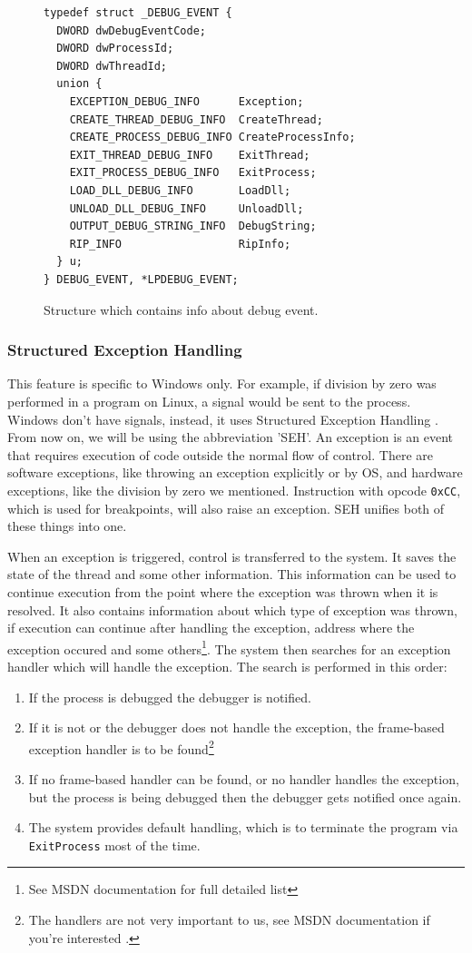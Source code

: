 \begin{figure}
\begin{verbatim}
typedef struct _DEBUG_EVENT {
  DWORD dwDebugEventCode;
  DWORD dwProcessId;
  DWORD dwThreadId;
  union {
    EXCEPTION_DEBUG_INFO      Exception;
    CREATE_THREAD_DEBUG_INFO  CreateThread;
    CREATE_PROCESS_DEBUG_INFO CreateProcessInfo;
    EXIT_THREAD_DEBUG_INFO    ExitThread;
    EXIT_PROCESS_DEBUG_INFO   ExitProcess;
    LOAD_DLL_DEBUG_INFO       LoadDll;
    UNLOAD_DLL_DEBUG_INFO     UnloadDll;
    OUTPUT_DEBUG_STRING_INFO  DebugString;
    RIP_INFO                  RipInfo;
  } u;
} DEBUG_EVENT, *LPDEBUG_EVENT;
\end{verbatim}
\caption{Structure which contains info about debug event.}
\label{fig:DebugEvent}
\end{figure}

\subsubsection*{Structured Exception Handling}
This feature is specific to Windows only. For example, if division by zero was
performed in a program on Linux, a signal would be sent to the process. Windows
don't have signals, instead, it uses Structured Exception Handling
\cite{windows-msdn-seh}. From now on, we will be using the abbreviation 'SEH'.
An exception is an event that requires execution of code outside the normal
flow of control. There are software exceptions, like throwing an exception
explicitly or by OS, and hardware exceptions, like the division by zero we
mentioned. Instruction with opcode \texttt{0xCC}, which is used for
breakpoints, will also raise an exception. SEH unifies both of these things
into one.

When an exception is triggered, control is transferred to the system. It saves
the state of the thread and some other information. This information can be
used to continue execution from the point where the exception was thrown when
it is resolved. It also contains information about which type of exception was
thrown, if execution can continue after handling the exception, address where
the exception occured and some others\footnote{See MSDN documentation
\cite{windows-msdn-seh} for full detailed list}. The system then searches for
an exception handler which will handle the exception. The search is performed
in this order:

\begin{enumerate}
    \item If the process is debugged the debugger is notified.
    \item If it is not or the debugger does not handle the exception, the frame-based exception handler is to be found\footnote{The handlers are not very important to us, see MSDN documentation if you're interested \cite{windows-msdn-seh}.}
    \item If no frame-based handler can be found, or no handler handles the exception, but the process is being debugged then the debugger gets notified once again.
    \item The system provides default handling, which is to terminate the program via \texttt{ExitProcess} most of the time.
\end{enumerate}

